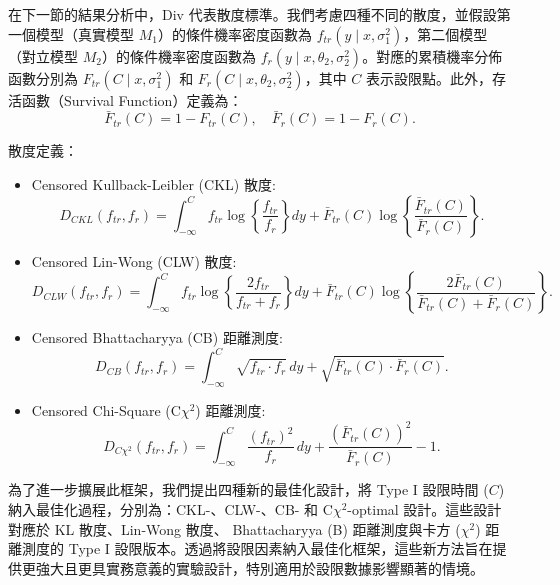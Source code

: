 \hspace*{8mm} 在下一節的結果分析中，$\text{Div}$ 代表散度標準。我們考慮四種不同的散度，並假設第一個模型（真實模型 $M_1$）的條件機率密度函數為 $f_{tr}(y \mid x, \sigma^2_1)$，第二個模型（對立模型 $M_2$）的條件機率密度函數為 $f_r(y \mid x, \theta_2, \sigma^2_2)$。對應的累積機率分佈函數分別為 $F_{tr}(C \mid x, \sigma^2_1)$ 和 $F_r(C \mid x, \theta_2, \sigma^2_2)$，其中 $C$ 表示設限點。此外，存活函數（Survival Function）定義為：
$$
\bar{F}_{tr}(C) = 1 - F_{tr}(C), \quad \bar{F}_r(C) = 1 - F_r(C).
$$

散度定義：

\begin{itemize}
\item Censored Kullback-Leibler (CKL) 散度:
\begin{equation}\label{eq:CKL distance measure}
D_{CKL}(f_{tr}, f_r) = \int_{-\infty}^C f_{tr} \log \left\{ \frac{f_{tr}}{f_r} \right\} dy + \bar{F}_{tr}(C) \log \left\{ \frac{\bar{F}_{tr}(C)}{\bar{F}_r(C)} \right\}.
\end{equation}
\item Censored Lin-Wong (CLW) 散度:
\begin{equation}\label{eq:CLW distance measure}
D_{CLW}(f_{tr}, f_r) = \int_{-\infty}^C f_{tr} \log \left\{ \frac{2f_{tr}}{f_{tr} + f_r} \right\} dy + \bar{F}_{tr}(C) \log \left\{ \frac{2\bar{F}_{tr}(C)}{ \bar{F}_{tr}(C) + \bar{F}_r(C)} \right\}.
\end{equation}
\item Censored Bhattacharyya (CB) 距離測度:
\begin{equation}\label{eq:CB distance measure}
D_{CB}(f_{tr}, f_r) = \int_{-\infty}^C \sqrt{f_{tr} \cdot f_r} \, dy + \sqrt{\bar{F}_{tr}(C) \cdot \bar{F}_r(C)}.
\end{equation}
\item Censored Chi-Square (C$\chi^2$) 距離測度:
\begin{equation}\label{eq:Cchi2 distance measure}
D_{C\chi^2}(f_{tr}, f_r) = \int_{-\infty}^C \frac{(f_{tr})^2}{f_r} \, dy + \frac{\left(\bar{F}_{tr}(C)\right)^2}{\bar{F}_r(C)} - 1.
\end{equation}
\end{itemize}

\hspace*{8mm} 為了進一步擴展此框架，我們提出四種新的最佳化設計，將 Type I 設限時間 ($C$) 納入最佳化過程，分別為：CKL-、CLW-、CB- 和 C$\chi^2$-optimal 設計。這些設計對應於 KL 散度、Lin-Wong 散度、 Bhattacharyya (B) 距離測度與卡方 ($\chi^2$) 距離測度的 Type I 設限版本。透過將設限因素納入最佳化框架，這些新方法旨在提供更強大且更具實務意義的實驗設計，特別適用於設限數據影響顯著的情境。

